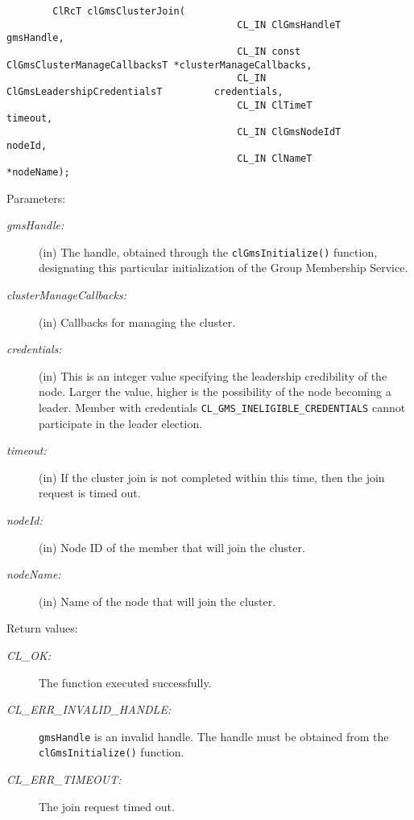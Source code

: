 \begin{flushleft}
\begin{Desc}
\footnotesize\begin{verbatim}        ClRcT clGmsClusterJoin(
                                		CL_IN ClGmsHandleT                        gmsHandle,
                                		CL_IN const ClGmsClusterManageCallbacksT *clusterManageCallbacks,
                                		CL_IN ClGmsLeadershipCredentialsT         credentials,
                                		CL_IN ClTimeT                             timeout,
                                		CL_IN ClGmsNodeIdT                        nodeId,
                                		CL_IN ClNameT                            *nodeName);
\end{verbatim}
\normalsize
\end{Desc}
\begin{Desc}
\item[Parameters:]
\begin{description}
\item[{\em gms\-Handle:}](in) The handle, obtained through the {\tt{clGmsInitialize()}} function, designating this particular initialization of the
Group Membership Service. \item[{\em cluster\-Manage\-Callbacks:}](in) Callbacks for managing the cluster.
\item[{\em credentials:}](in) This is an integer
value specifying the leadership credibility of the node. Larger the value, higher is the possibility of the node becoming a leader. Member with
credentials {\tt{CL\_\-GMS\_\-INELIGIBLE\_\-CREDENTIALS}} cannot participate in the leader election.
\item[{\em timeout:}](in) If the cluster join is not
completed within this time, then the join request is timed out. \item[{\em node\-Id:}](in) Node ID of the member that will join the cluster.
\item[{\em node\-Name:}](in) Name of the node that will join the cluster.\end{description}
\end{Desc}
\begin{Desc}
\item[Return values:]
\begin{description}
\item[{\em CL\_\-OK:}]The function executed successfully.
\item[{\em CL\_\-ERR\_\-INVALID\_\-HANDLE:}]{\tt{gmsHandle}} is an invalid handle. The handle must be obtained from the
{\tt{clGmsInitialize()}} function.
\item[{\em CL\_\-ERR\_\-TIMEOUT:}]The join request timed out.

\end{description}
\end{Desc}
\end{flushleft}
